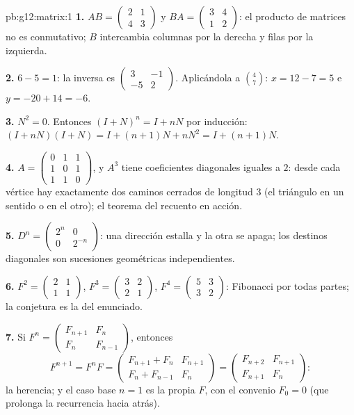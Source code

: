 \begin{solution}{pb:g12:matrix:1}
\textbf{1.} $AB = \begin{pmatrix} 2 & 1\\ 4 & 3\end{pmatrix}$ y
$BA = \begin{pmatrix} 3 & 4\\ 1 & 2\end{pmatrix}$: el producto de matrices
no es conmutativo; $B$ intercambia columnas por la derecha y filas por la
izquierda.

\textbf{2.}  $6 - 5 = 1$: la inversa es
$\begin{pmatrix} 3 & -1\\ -5 & 2\end{pmatrix}$. Aplicándola a
$\binom{4}{7}$: $x = 12 - 7 = 5$ e $y = -20 + 14 = -6$.

\textbf{3.} $N^2 = 0$. Entonces $(I + N)^n = I + nN$ por inducción:
$(I + nN)(I + N) = I + (n+1)N + nN^2 = I + (n+1)N$.

\textbf{4.} $A = \begin{pmatrix} 0&1&1\\ 1&0&1\\ 1&1&0
\end{pmatrix}$, y $A^3$ tiene coeficientes diagonales iguales a $2$: desde
cada vértice hay exactamente dos caminos cerrados de longitud $3$ (el
triángulo  en un sentido o en el otro); el teorema del recuento en
acción.

\textbf{5.} $D^n = \begin{pmatrix} 2^n & 0\\ 0 & 2^{-n}
\end{pmatrix}$: una dirección estalla y la otra se apaga; los destinos
diagonales son sucesiones geométricas independientes.

\textbf{6.} $F^2 = \begin{pmatrix} 2 & 1\\ 1 & 1\end{pmatrix}$,
$F^3 = \begin{pmatrix} 3 & 2\\ 2 & 1\end{pmatrix}$,
$F^4 = \begin{pmatrix} 5 & 3\\ 3 & 2\end{pmatrix}$: Fibonacci por todas
partes; la conjetura es la del enunciado.

\textbf{7.} Si $F^n = \begin{pmatrix} F_{n+1} & F_n\\ F_n &
F_{n-1}\end{pmatrix}$, entonces
\[
F^{n+1} = F^n F =
\begin{pmatrix} F_{n+1} + F_n & F_{n+1}\\
F_n + F_{n-1} & F_n \end{pmatrix}
= \begin{pmatrix} F_{n+2} & F_{n+1}\\ F_{n+1} & F_n
\end{pmatrix} :
\]
la herencia; y el caso base $n = 1$ es la propia $F$, con el convenio
$F_0 = 0$ (que prolonga la recurrencia hacia atrás).


\end{solution}
